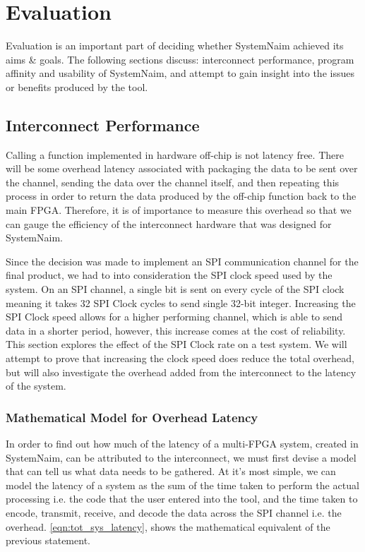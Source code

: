 \chapter{Evaluation}

Evaluation is an important part of deciding whether SystemNaim achieved its aims \& goals. The following sections discuss: interconnect performance, program affinity and usability of SystemNaim, and attempt to gain insight into the issues or benefits produced by the tool.

\section{Interconnect Performance}
\label{sec:interconnect}

Calling a function implemented in hardware off-chip is not latency free. There will be some overhead latency associated with packaging the data to be sent over the channel, sending the data over the channel itself, and then repeating this process in order to return the data produced by the off-chip function back to the main FPGA. Therefore, it is of importance to measure this overhead so that we can gauge the efficiency of the interconnect hardware that was designed for SystemNaim.

Since the decision was made to implement an SPI communication channel for the final product, we had to into consideration the SPI clock speed used by the system. On an SPI channel, a single bit is sent on every cycle of the SPI clock meaning it takes 32 SPI Clock cycles to send single 32-bit integer. Increasing the SPI Clock speed allows for a higher performing channel, which is able to send data in a shorter period, however, this increase comes at the cost of reliability. This section explores the effect of the SPI Clock rate on a test system. We will attempt to prove that increasing the clock speed does reduce the total overhead, but will also investigate the overhead added from the interconnect to the latency of the system.

\subsection{Mathematical Model for Overhead Latency}

In order to find out how much of the latency of a multi-FPGA system, created in SystemNaim, can be attributed to the interconnect, we must first devise a model that can tell us what data needs to be gathered. At it's most simple, we can model the latency of a system as the sum of the time taken to perform the actual processing i.e. the code that the user entered into the tool, and the time taken to encode, transmit, receive, and decode the data across the SPI channel i.e. the overhead. \autoref{eqn:tot_sys_latency}, shows the mathematical equivalent of the previous statement.


